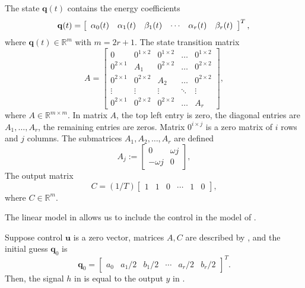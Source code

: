 The state $\mathbf{q}(t)$ contains the energy coefficients
\begin{equation}\label{eq:state-details}
  \mathbf{q}(t)=\left[\begin{array}{cccccc}
    \alpha_0(t) & \alpha_1(t) & \beta_1(t) & \cdots & \alpha_r(t) & \beta_r(t)
  \end{array}\right]^T,\\
\end{equation}
where $\mathbf{q}(t)\in\mathbb{R}^m$ with $m=2r+1$. The state transition matrix
\begin{equation}\label{eq:mat_A}
  A=\left[\begin{array}{ccccc}
    0            & 0^{1\times 2}& 0^{1\times 2}& \dots& 0^{1\times 2} \\
    0^{2\times 1}& A_1          & 0^{2\times 2}& \dots& 0^{2\times 2} \\
    0^{2\times 1}& 0^{2\times 2}& A_2          & \dots& 0^{2\times 2} \\
    \vdots       & \vdots       & \vdots       &\ddots& \vdots        \\
    0^{2\times 1}& 0^{2\times 2}& 0^{2\times 2}& \dots& A_r 
  \end{array}\right],
\end{equation}
where $A\in\mathbb{R}^{m\times m}$. In matrix $A$, the top left entry is zero, the diagonal entries are $A_1,\dots,A_r$, the remaining entries are zeros. Matrix $0^{i\times j}$ is a zero matrix of $i$ rows and $j$ columns. The submatrices $A_1,A_2,\dots,A_r$ are defined
\begin{equation}
  A_j:=\begin{bmatrix}0 & \omega j \\ -\omega j & 0\end{bmatrix},
\end{equation}
The output matrix
\begin{equation}\label{eq:mat_C}
  C=(1/T)\left[\begin{array}{cccccc}
    1 & 1 & 0 &\cdots & 1 & 0
  \end{array}\right],
\end{equation}
where $C\in\mathbb{R}^m$.

The linear model in  allows us to include the control in the model of .

\begin{highlight}
\begin{lem}\label{lem:eqv}Suppose control $\mathbf{u}$ is a zero vector, matrices $A,C$ are described by , and the initial guess $\mathbf{q}_0$ is 
  \begin{equation*}
  \mathbf{q}_0=\begin{bmatrix}a_0 & a_1/2 & b_1/2 & \cdots & a_r/2 & b_r/2\end{bmatrix}^T.
  \end{equation*} 
  Then, the signal $h$ in  is equal to the output $y$ in .
\end{lem}
\end{highlight}

